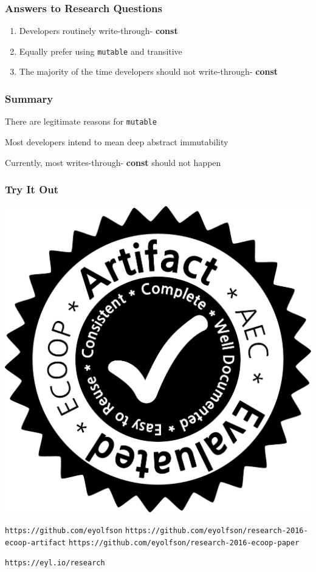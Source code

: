 \documentclass[aspectratio=169]{beamer}
\newcommand{\const}{{\color{blue} \bfseries \ttfamily const}}
\begin{document}
  \begin{frame}
    \frametitle{Answers to Research Questions}
    \Large
    \begin{enumerate}
      \setlength\itemsep{0.5em}
      \item Developers routinely write-through-\const{}
      \item Equally prefer using \texttt{mutable} and transitive
      \item The majority of the time developers should not write-through-\const{}
    \end{enumerate}
  \end{frame}

  \begin{frame}
    \frametitle{Summary}
    \Large
    There are legitimate reasons for \texttt{mutable}

    \vspace{1em}
    Most developers intend to mean deep abstract immutability

    \vspace{1em}
    Currently, most writes-through-\const{} should not happen
  \end{frame}

  \begin{frame}
    \frametitle{Try It Out}

    \begin{center}
      \includegraphics[scale=0.1]{aec-badge-ecoop}

      \vspace{0.25em}
      \texttt{\huge https://github.com/eyolfson}
      \texttt{https://github.com/eyolfson/research-2016-ecoop-artifact}
      \texttt{https://github.com/eyolfson/research-2016-ecoop-paper}

      \vspace{2em}
      \texttt{\huge https://eyl.io/research}
    \end{center}

  \end{frame}
\end{document}
